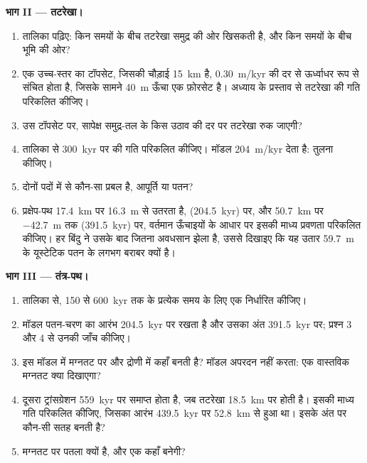 \begin{problem}
\medskip\noindent\textbf{भाग II --- तटरेखा।}
\begin{enumerate}[resume]
\item तालिका पढ़िए: किन समयों के बीच तटरेखा समुद्र की ओर खिसकती है,
  और किन समयों के बीच भूमि की ओर?
\item एक उच्च-स्तर का टॉपसेट, जिसकी चौड़ाई \qty{15}{km} है, \qty{0.30}{m/kyr} की दर से ऊर्ध्वाधर रूप से संचित होता है,
  जिसके सामने \qty{40}{m} ऊँचा एक फ़ोरसेट है। अध्याय के प्रस्ताव से
  तटरेखा की गति परिकलित कीजिए।
\item उस टॉपसेट पर, सापेक्ष समुद्र-तल के किस उठाव की दर पर तटरेखा रुक जाएगी?
\item तालिका से \qty{300}{kyr} पर  की गति परिकलित कीजिए।
  मॉडल \qty{204}{m/kyr} देता है: तुलना कीजिए।
\item दोनों पदों में से कौन-सा प्रबल है, आपूर्ति या पतन?
\item प्रक्षेप-पथ \qty{17.4}{km} पर \qty{16.3}{m} से उतरता है,
  (\qty{204.5}{kyr}) पर, और \qty{50.7}{km} पर \qty{-42.7}{m} तक
  (\qty{391.5}{kyr}) पर, वर्तमान ऊँचाइयों के आधार पर इसकी माध्य प्रवणता परिकलित कीजिए।
  हर बिंदु ने उसके बाद जितना अवधसान झेला है, उससे दिखाइए कि यह उतार
  \qty{59.7}{m} के यूस्टेटिक पतन के लगभग बराबर क्यों है।
\end{enumerate}

\medskip\noindent\textbf{भाग III --- तंत्र-पथ।}
\begin{enumerate}[resume]
\item तालिका से, 150 से
  \qty{600}{kyr} तक के प्रत्येक समय के लिए एक  निर्धारित कीजिए।
\item मॉडल पतन-चरण का आरंभ \qty{204.5}{kyr} पर रखता है
  और उसका अंत \qty{391.5}{kyr} पर; प्रश्न 3 और 4 से उनकी जाँच कीजिए।
\item इस मॉडल में  मग्नतट पर और
  द्रोणी में कहाँ बनती है? मॉडल अपरदन नहीं करता: एक वास्तविक मग्नतट क्या दिखाएगा?
\item दूसरा ट्रांसग्रेशन \qty{559}{kyr} पर समाप्त होता है, जब तटरेखा
  \qty{18.5}{km} पर होती है। इसकी माध्य गति परिकलित कीजिए, जिसका आरंभ \qty{439.5}{kyr} पर
  \qty{52.8}{km} से हुआ था। इसके अंत पर कौन-सी सतह बनती है?
\item {} मग्नतट पर पतला क्यों है, और
  एक  कहाँ बनेगी?
\end{enumerate}


\end{problem}
